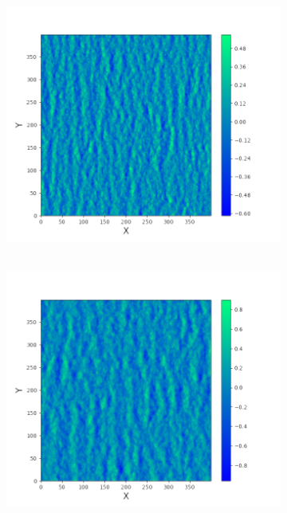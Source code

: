 \documentclass[10pt,pdf,hyperref={unicode}, dvipsnames]{beamer}
\begin{document}
\begin{frame}[t]

    \begin{figure}[h!]
\begin{subfigure}[b]{0.45\linewidth}
	\vskip -20pt
	\centering
	\includegraphics[width=\linewidth]{img/water5.png}
	\vskip -5pt
	\caption{~}
	\label{fig:water5}
\end{subfigure}
\hfill
\begin{subfigure}[b]{0.45\linewidth}
	\vskip -20pt
	\centering
	\includegraphics[width=\linewidth]{img/water6.png}
	\vskip -5pt
	\caption{~}
	\label{fig:water6}
\end{subfigure}


\end{figure}
\end{frame}
\end{document}
